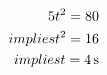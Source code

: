 \documentclass[preview]{standalone}
\begin{document}
\begin{align*}
\special{dvisvgm:raw <g id='unique000'>}5t^2 = 80 \\implies t^2 = 16 \\implies t = 4\,\mathrm{s}\special{dvisvgm:raw </g>}
\end{align*}
\end{document}
